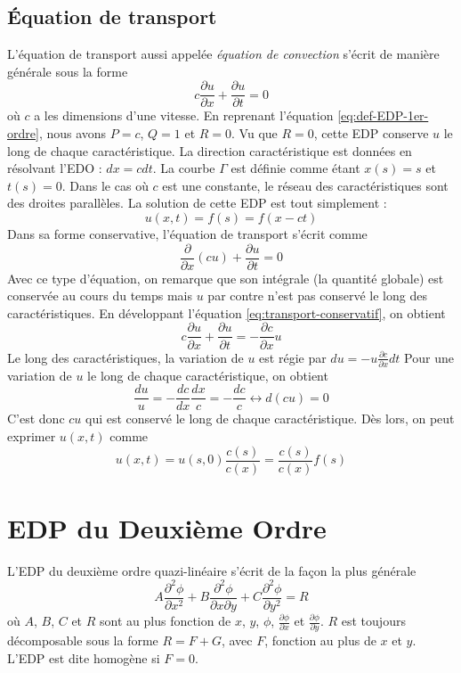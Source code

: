 \section{Équation de transport}
L'équation de transport aussi appelée \emph{équation de convection} s'écrit de manière générale sous la forme 
\begin{equation}
c\frac{\partial u}{\partial x} + \frac{\partial u}{\partial t} = 0
\end{equation}
où $c$ a les dimensions d'une vitesse. En reprenant l'équation \ref{eq:def-EDP-1er-ordre}, nous avons $P=c$, $Q=1$ et $R=0$. Vu que $R=0$, cette EDP conserve $u$ le long de chaque caractéristique. La direction caractéristique est données en résolvant l'EDO : $ dx = c dt$. 
La courbe $\Gamma$ est définie comme étant $x(s)=s$ et $t(s)=0$. Dans le cas où $c$ est une constante, le réseau des caractéristiques sont des droites parallèles. La solution de cette EDP est tout simplement : $$ u(x,t) = f(s) = f(x-ct)$$
Dans sa forme conservative, l'équation de transport s'écrit comme
\begin{equation}
\frac{\partial}{\partial x}(cu) + \frac{\partial u}{\partial t} = 0
\label{eq:transport-conservatif}
\end{equation}
Avec ce type d'équation, on remarque que son intégrale (la quantité globale) est conservée au cours du temps mais $u$ par contre n'est pas conservé le long des caractéristiques. En développant l'équation \ref{eq:transport-conservatif}, on obtient 
\begin{equation}
c\frac{\partial u}{\partial x} + \frac{\partial u}{\partial t	} = -\frac{\partial c}{\partial x}u
\end{equation}
Le long des caractéristiques, la variation de $u$ est régie par $du = -u\frac{\partial c}{\partial x}dt $ Pour une variation de $u$ le long de chaque caractéristique, on obtient 
$$ \frac{du}{u}=-\frac{dc}{dx}\frac{dx}{c} = -\frac{dc}{c}\leftrightarrow d(cu)=0 $$
C'est donc $cu$ qui est conservé le long de chaque caractéristique. Dès lors, on peut exprimer $u(x,t)$ comme
\begin{equation}
u(x,t)=u(s,0)\frac{c(s)}{c(x)}=\frac{c(s)}{c(x)}f(s)
\end{equation}

\chapter{EDP du Deuxième Ordre}
L'EDP du deuxième ordre quazi-linéaire s'écrit de la façon la plus générale
\begin{equation}
A \frac{\partial ^2 \phi}{\partial x^2} + B \frac{\partial ^2 \phi}{\partial x \partial y} + C \frac{\partial ^2 \phi}{\partial y^2} =R
\end{equation}
où $A$, $B$, $C$ et $R$ sont au plus fonction de $x$, $y$, $\phi$, $\frac{\partial \phi}{\partial x}$ et $\frac{\partial \phi}{\partial y}$. $R$ est toujours décomposable sous la forme $R = F + G$, avec $F$, fonction au plus de $x$ et $y$. L'EDP est dite homogène si $F=0$.

